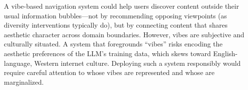 A vibe-based navigation system could help users discover content outside their usual information bubbles---not by recommending opposing viewpoints (as diversity interventions typically do), but by connecting content that shares aesthetic character across domain boundaries.
However, vibes are subjective and culturally situated.
A system that foregrounds ``vibes'' risks encoding the aesthetic preferences of the LLM's training data, which skews toward English-language, Western internet culture.
Deploying such a system responsibly would require careful attention to whose vibes are represented and whose are marginalized.
